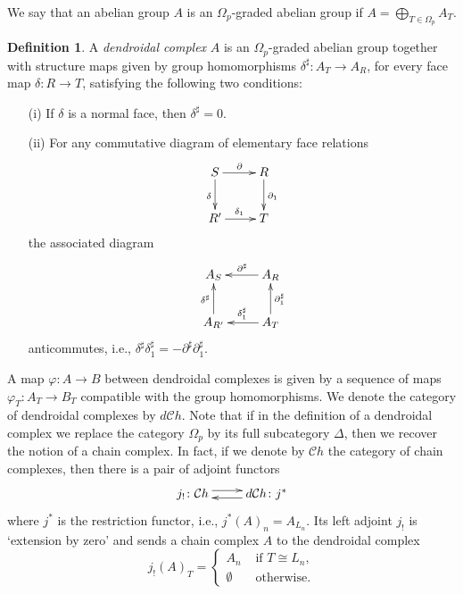 \documentclass[a4paper]{amsart}
\theoremstyle{plain}
\theoremstyle{definition}
\newtheorem{dfn}[thm]{Definition}
\theoremstyle{remark}
\newcommand{\rpd}{\Omega_p}
\newcommand{\To}{\longrightarrow}
\newcommand{\Ch}{\mathcal{C}h}
\newcommand{\dCh}{d\mathcal{C}h}
\numberwithin{equation}{section}
\numberwithin{figure}{section}
\begin{document}
We say that an abelian group $A$ is an $\rpd$-graded abelian group if $A=\bigoplus_{T\in \rpd} A_T$.
\begin{dfn}
    A \emph{dendroidal complex} $A$ is an $\rpd$-graded abelian group together with structure maps given by group
    homomorphisms $\delta^\sharp\colon A_T\To A_R$, for every face map $\delta\colon R\To T$, satisfying the
    following two conditions:
    \begin{itemize}
        \item[{\rm (i)}] If $\delta$ is a normal face, then $\delta^\sharp=0$.
        \item[{\rm (ii)}] For any commutative diagram of elementary face relations
              $$
                  \xymatrix{
                      S\ar[r]^\partial\ar[d]_\delta & R \ar[d]^{\partial_1} \\
                      R'\ar[r]^{\delta_1} & T }
              $$
              the associated diagram
              \[
                  \xymatrix{
                      A_S & A_{R} \ar[l]_{\partial^\sharp} \\
                      A_{R'}\ar[u]^{\delta^\sharp} & A_T\ar[l]_{\delta_1^\sharp}\ar[u]_{\partial_1^\sharp} }
              \]
              anticommutes, i.e., $\delta^{\sharp}\delta_1^{\sharp}=-\partial^{\sharp}\partial_1^{\sharp}$.
    \end{itemize}
\end{dfn}

A map $\varphi\colon A\longrightarrow B$ between dendroidal complexes is given by a sequence of maps $\varphi_T\colon A_T\longrightarrow B_T$
compatible with the group homomorphisms. We denote the category of dendroidal complexes by $d\Ch$. Note
that if in the definition of a dendroidal complex we replace the category $\rpd$ by its full subcategory $\Delta$,
then we recover the notion of a chain complex. In fact, if we denote by $\Ch$ the category of chain complexes, then there is a pair of
adjoint functors
\begin{equation}
    \xymatrix{
        j_!\colon \Ch \ar@<3pt>[r] & \ar@<3pt>[l] \dCh\colon j^*
    }
    \label{dChadj}
\end{equation}
where $j^*$ is the restriction functor, i.e., $j^*(A)_n=A_{L_n}$. Its left adjoint $j_!$ is `extension by zero' and sends a chain complex
$A$ to the dendroidal complex
$$
    j_!(A)_T=\left\{
    \begin{array}{cc}
        A_n       & \mbox{ if $T\cong L_n$}, \\
        \emptyset & \mbox{ otherwise}.
    \end{array}
    \right.
$$
\end{document}

